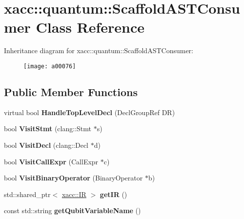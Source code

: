 \hypertarget{a00076}{}\section{xacc\+:\+:quantum\+:\+:Scaffold\+A\+S\+T\+Consumer Class Reference}
\label{a00076}
Inheritance diagram for xacc\+:\+:quantum\+:\+:Scaffold\+A\+S\+T\+Consumer\+:\begin{figure}[H]
\begin{center}
\leavevmode
\texttt{[image: a00076]}
\end{center}
\end{figure}
\subsection*{Public Member Functions}
\begin{DoxyCompactItemize}
\item 
virtual bool {\bfseries Handle\+Top\+Level\+Decl} (Decl\+Group\+Ref DR)\hypertarget{a00076_ae846fd40684f3a1f820b8711e1204089}{}\label{a00076_ae846fd40684f3a1f820b8711e1204089}

\item 
bool {\bfseries Visit\+Stmt} (clang\+::\+Stmt $\ast$s)\hypertarget{a00076_a6693c27f68332d8142fbdcb405e3259b}{}\label{a00076_a6693c27f68332d8142fbdcb405e3259b}

\item 
bool {\bfseries Visit\+Decl} (clang\+::\+Decl $\ast$d)\hypertarget{a00076_ae6a05fe567cd8ea15feb694dbb898c33}{}\label{a00076_ae6a05fe567cd8ea15feb694dbb898c33}

\item 
bool {\bfseries Visit\+Call\+Expr} (Call\+Expr $\ast$c)\hypertarget{a00076_a1478fc9e887b04d2ad2aa8347ef6bbcb}{}\label{a00076_a1478fc9e887b04d2ad2aa8347ef6bbcb}

\item 
bool {\bfseries Visit\+Binary\+Operator} (Binary\+Operator $\ast$b)\hypertarget{a00076_a3f2f070888678caf53e57041b4f5ddd6}{}\label{a00076_a3f2f070888678caf53e57041b4f5ddd6}

\item 
std\+::shared\+\_\+ptr$<$ \hyperlink{a00050}{xacc\+::\+IR} $>$ {\bfseries get\+IR} ()\hypertarget{a00076_af9dbfa7c52b8a7de99132257e154e29a}{}\label{a00076_af9dbfa7c52b8a7de99132257e154e29a}

\item 
const std\+::string {\bfseries get\+Qubit\+Variable\+Name} ()\hypertarget{a00076_aa301f0bcae6fb5a1c17557ba08144cb4}{}\label{a00076_aa301f0bcae6fb5a1c17557ba08144cb4}

\end{DoxyCompactItemize}
